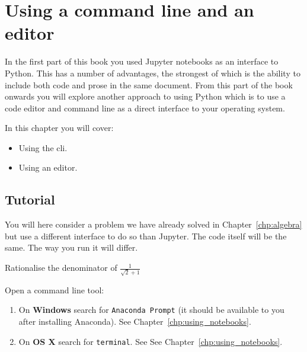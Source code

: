 \chapter{Using a command line and an editor}

In the first part of this book you used Jupyter notebooks as an interface to
Python. This has a number of advantages, the strongest of which is the ability
to include both code and prose in the same document. From this part of the book
onwards you will explore another approach to using Python which is to use 
a code editor and command line as a direct interface to your operating system.

\begin{note}
In this chapter you will cover:
\begin{itemize}
\item 

Using the cli.

\item 

Using an editor.

\end{itemize}
\end{note}





\section{Tutorial}

You will here consider a problem we have already solved in
Chapter~\ref{chp:algebra}
 but use a different interface to do so than Jupyter.
The code itself will be the same. The way you run it will differ.

Rationalise the denominator of \(\frac{1}{\sqrt{2} + 1}\)

Open a command line tool:

\begin{enumerate}

\item 

On \textbf{Windows} search for \texttt{Anaconda Prompt} (it should be available to you
after installing Anaconda). See Chapter~\ref{chp:using_notebooks}.

\item 

On \textbf{OS X} search for \texttt{terminal}. See
See Chapter~\ref{chp:using_notebooks}.


\end{enumerate}

